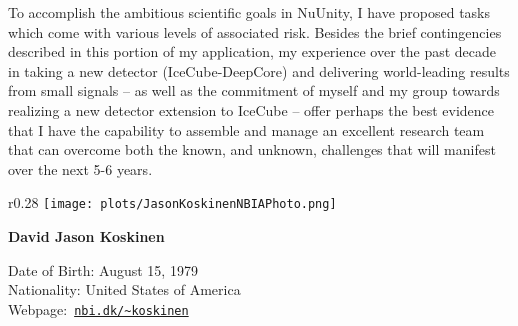 \documentclass[a4paper,11pt]{article}
\begin{document}
To accomplish the ambitious scientific goals in NuUnity, I have proposed tasks which come with various levels of associated risk. Besides the brief contingencies described in this portion of my application, my experience over the past decade in taking a new detector (IceCube-DeepCore) and delivering world-leading results from small signals\cite{Aartsen:2019tjl,Aartsen:2017ulx} -- as well as the commitment of myself and my group towards realizing a new detector extension to IceCube -- offer perhaps the best evidence that I have the capability to assemble and manage an excellent research team that can overcome both the known, and unknown, challenges that will manifest over the next 5-6 years.




\newpage


\begin{wrapfigure}[0]{r}{0.28\textwidth}
\vspace{-0.3cm}
\raggedleft
\texttt{[image: plots/JasonKoskinenNBIAPhoto.png]}
\end{wrapfigure}
{\Large\textbf{David Jason Koskinen}}


Date of Birth: August 15, 1979\\
Nationality: United States of America\\
Webpage:~\href{http://www.nbi.dk/~koskinen/}{\nolinkurl{nbi.dk/~koskinen}}\\
~\\
\end{document}
